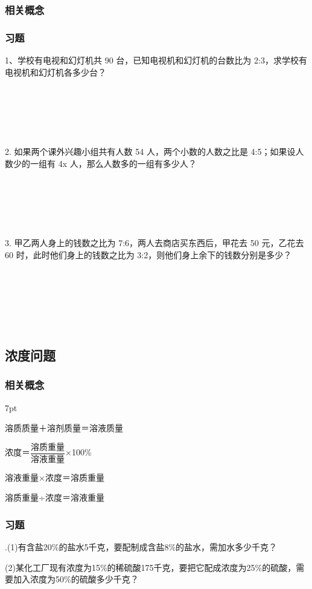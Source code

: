 \documentclass{article}
\newenvironment{wa}{%
\def\FrameCommand{%
\hspace{1pt}%
{\color{LightCoral}\vrule width 2pt}%
{\color{washade}\vrule width 4pt}%
\colorbox{washade}%
}%
\MakeFramed{\advance\hsize-\width\FrameRestore}%
\noindent\hspace{-4.55pt}%
\begin{adjustwidth}{}{7pt}%
\vspace{2pt}\vspace{2pt}%
\normalfont %
}
{%
\vspace{2pt}\end{adjustwidth}\endMakeFramed%
}
\begin{document}
\subsubsection*{相关概念}
\subsubsection*{习题}
1、学校有电视和幻灯机共 90 台，已知电视机和幻灯机的台数比为 2:3，求学校有电视机和幻灯机各多少台？

~\\
~\\
~\\
~\\
~\\
2. 如果两个课外兴趣小组共有人数 54 人，两个小数的人数之比是 4:5；如果设人数少的一组有 4x 人，那么人数多的一组有多少人？

~\\
~\\
~\\
~\\
~\\
3. 甲乙两人身上的钱数之比为 7:6，两人去商店买东西后，甲花去 50 元，乙花去 60 时，此时他们身上的钱数之比为 3:2，则他们身上余下的钱数分别是多少？

~\\
~\\
~\\
~\\
~\\
\newpage
\subsection{浓度问题}
\subsubsection*{相关概念}
\begin{wa}
   \quad \quad 溶质质量＋溶剂质量＝溶液质量

    浓度＝$\dfrac{\text{溶质重量}}{\text{溶液重量}}$×100\%

    溶液重量×浓度＝溶质重量

    溶质重量÷浓度＝溶液重量
\end{wa}
\subsubsection*{习题}
.\quad (1)有含盐20\%的盐水5千克，要配制成含盐8\%的盐水，需加水多少千克？

(2)某化工厂现有浓度为15\%的稀硫酸175千克，要把它配成浓度为25\%的硫酸，需要加入浓度为50\%的硫酸多少千克？
\end{document}
